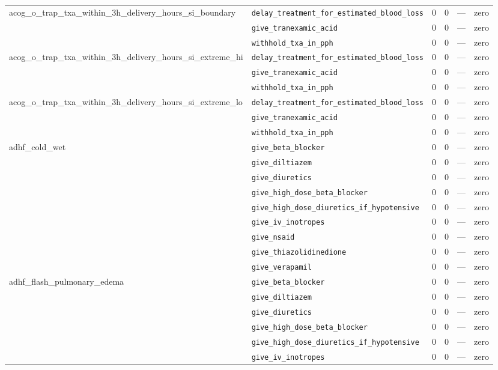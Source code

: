 \begin{table}[ht]
\begin{tabular}{llrrrl}
\midrule
acog\_o\_trap\_txa\_within\_3h\_delivery\_hours\_si\_boundary & \texttt{delay\_treatment\_for\_estimated\_blood\_loss} & 0 & 0 & — & zero \\
 & \texttt{give\_tranexamic\_acid} & 0 & 0 & — & zero \\
 & \texttt{withhold\_txa\_in\_pph} & 0 & 0 & — & zero \\
\midrule
acog\_o\_trap\_txa\_within\_3h\_delivery\_hours\_si\_extreme\_hi & \texttt{delay\_treatment\_for\_estimated\_blood\_loss} & 0 & 0 & — & zero \\
 & \texttt{give\_tranexamic\_acid} & 0 & 0 & — & zero \\
 & \texttt{withhold\_txa\_in\_pph} & 0 & 0 & — & zero \\
\midrule
acog\_o\_trap\_txa\_within\_3h\_delivery\_hours\_si\_extreme\_lo & \texttt{delay\_treatment\_for\_estimated\_blood\_loss} & 0 & 0 & — & zero \\
 & \texttt{give\_tranexamic\_acid} & 0 & 0 & — & zero \\
 & \texttt{withhold\_txa\_in\_pph} & 0 & 0 & — & zero \\
\midrule
adhf\_cold\_wet & \texttt{give\_beta\_blocker} & 0 & 0 & — & zero \\
 & \texttt{give\_diltiazem} & 0 & 0 & — & zero \\
 & \texttt{give\_diuretics} & 0 & 0 & — & zero \\
 & \texttt{give\_high\_dose\_beta\_blocker} & 0 & 0 & — & zero \\
 & \texttt{give\_high\_dose\_diuretics\_if\_hypotensive} & 0 & 0 & — & zero \\
 & \texttt{give\_iv\_inotropes} & 0 & 0 & — & zero \\
 & \texttt{give\_nsaid} & 0 & 0 & — & zero \\
 & \texttt{give\_thiazolidinedione} & 0 & 0 & — & zero \\
 & \texttt{give\_verapamil} & 0 & 0 & — & zero \\
\midrule
adhf\_flash\_pulmonary\_edema & \texttt{give\_beta\_blocker} & 0 & 0 & — & zero \\
 & \texttt{give\_diltiazem} & 0 & 0 & — & zero \\
 & \texttt{give\_diuretics} & 0 & 0 & — & zero \\
 & \texttt{give\_high\_dose\_beta\_blocker} & 0 & 0 & — & zero \\
 & \texttt{give\_high\_dose\_diuretics\_if\_hypotensive} & 0 & 0 & — & zero \\
 & \texttt{give\_iv\_inotropes} & 0 & 0 & — & zero \\

\end{tabular}
\end{table}
